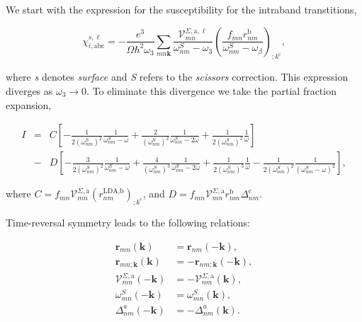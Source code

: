 \documentclass[11pt]{article}
\begin{document}
We start with the expression for the susceptibility for the intraband transtitions,

\begin{equation}\label{chii}
\chi_{i,\text{a}\text{b}\text{c}}^{s,\ell}=-\frac{e^3}{\Omega\hbar^2\omega_3}\sum_{mn\mathbf{k}}\frac{\mathcal{V}_{mn}^{\Sigma,\text{a},\ell}}{\omega^S_{nm}-\omega_3}\left(\frac{f_{mn}r_{nm}^{\text{b}}}{\omega^S_{nm}-\omega_\beta}\right)_{;k^{\text{c}}},
\end{equation} 

where \emph{s} denotes \emph{surface} and \emph{S} refers to the \emph{scissors} correction. This expression diverges as $\omega_{3} \rightarrow 0$. To eliminate this divergence we take the partial fraction expansion,

\begin{eqnarray}\label{pfi} 
I &=& C \left[-\frac{1}{2(\omega^{S}_{nm})^{2}}\frac{1}{\omega^{S}_{nm}-\omega}+\frac{2}{(\omega^{S}_{nm})^{2}}\frac{1}{\omega^{S}_{nm}-2\omega}+\frac{1}{2(\omega^{S}_{nm})^{2}}\frac{1}{\omega}\right]\nonumber\\
&-& D \left[-\frac{3}{2(\omega^{S}_{nm})^{2}}\frac{1}{\omega^{S}_{nm}-\omega}+\frac{4}{(\omega^{S}_{nm})^{3}}\frac{1}{\omega^{S}_{nm}-2\omega}+\frac{1}{2(\omega^{S}_{nm})^{3}}\frac{1}{\omega}-\frac{1}{2(\omega^{S}_{nm})^{2}}\frac{1}{(\omega^{S}_{nm}-\omega)^2}\right],
\end{eqnarray} 

where $C = f_{mn}\mathcal{V}^{\Sigma,\text{a}}_{mn}(r^{\text{LDA},\text{b}}_{nm})_{;k^{\text{c}}}$, and $D=f_{mn}\mathcal{V}^{\Sigma,\text{a}}_{mn}r^{\text{b}}_{nm}\Delta^{\text{c}}_{nm}$.

Time-reversal symmetry leads to the following relations:

\begin{eqnarray*}
\mathbf{r}_{mn}(\mathbf{k})                                 &=  \mathbf{r}_{nm}(-\mathbf{k}),                               \\
\mathbf{r}_{mn;\mathbf{k}}(\mathbf{k})                      &=  -\mathbf{r}_{nm;\mathbf{k}}(-\mathbf{k}),                   \\
\mathbf{\mathcal{V}}_{mn}^{\Sigma,\text{a}}(-\mathbf{k})    &=  -\mathbf{\mathcal{V}}_{nm}^{\Sigma,\text{a}}(\mathbf{k}),   \\
\omega_{mn}^{S}(-\mathbf{k})                                &=  \omega_{mn}^{S}(\mathbf{k}),                                \\
\Delta^a_{nm}(-\mathbf{k})                                  &=  -\Delta^a_{nm}(\mathbf{k}).
\end{eqnarray*}
\end{document}
